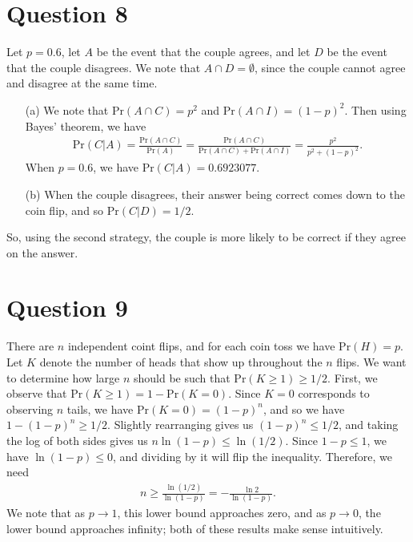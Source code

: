 \documentclass[10pt]{article}
\begin{document}
\section{Question 8} \noindent
Let \(p = 0.6\), let \(A\) be the event that the couple agrees, and let \(D\) be the event that the couple disagrees. We note that \(A \cap D = \emptyset\), 
since the couple cannot agree and disagree at the same time. 
\begin{itemize}
    \item[(a)] We note that \(\mathrm{Pr}(A \cap C) = p^2\) and \(\mathrm{Pr}(A \cap I) = (1-p)^2\). Then using Bayes' theorem, we have 
    \begin{align*}
        \mathrm{Pr}(C | A) = \frac{\mathrm{Pr}(A \cap C)}{\mathrm{Pr}(A)} = \frac{\mathrm{Pr}(A \cap C)}{\mathrm{Pr}(A \cap C) + \mathrm{Pr}(A \cap I)} 
        = \frac{p^2}{p^2 + (1-p)^2}.
    \end{align*}
    When \(p = 0.6\), we have \(\mathrm{Pr}(C | A) = 0.6923077\).
    \item[(b)] When the couple disagrees, their answer being correct comes down to the coin flip, and so \(\mathrm{Pr}(C | D) = 1/2\). 
\end{itemize}
So, using the second strategy, the couple is more likely to be correct if they agree on the answer. 

\section{Question 9} \noindent
There are \(n\) independent coint flips, and for each coin toss we have \(\mathrm{Pr}(H) = p\). Let \(K\) denote the number of heads that show up throughout
the \(n\) flips. We want to determine how large \(n\) should be such that \(\mathrm{Pr}(K \ge 1) \ge 1/2\). First, we observe that \(\mathrm{Pr}(K \ge 1) = 
1 - \mathrm{Pr}(K = 0)\). Since \(K = 0\) corresponds to observing \(n\) tails, we have \(\mathrm{Pr}(K = 0) = (1-p)^n\), and so we have 
\(1 - (1-p)^n \ge 1/2\). Slightly rearranging gives us \((1-p)^n \le 1/2\), and taking the log of both sides gives us \(n \ln(1 - p) \le \ln(1/2)\). Since 
\(1 - p \le 1\), we have \(\ln(1-p) \le 0\), and dividing by it will flip the inequality. Therefore, we need 
\begin{align*}
    n \ge \frac{\ln(1/2)}{\ln(1-p)} = - \frac{\ln 2}{\ln (1-p)}.
\end{align*}
We note that as \(p \to 1\), this lower bound approaches zero, and as \(p \to 0\), the lower bound approaches infinity; 
both of these results make sense intuitively. 
\end{document}
